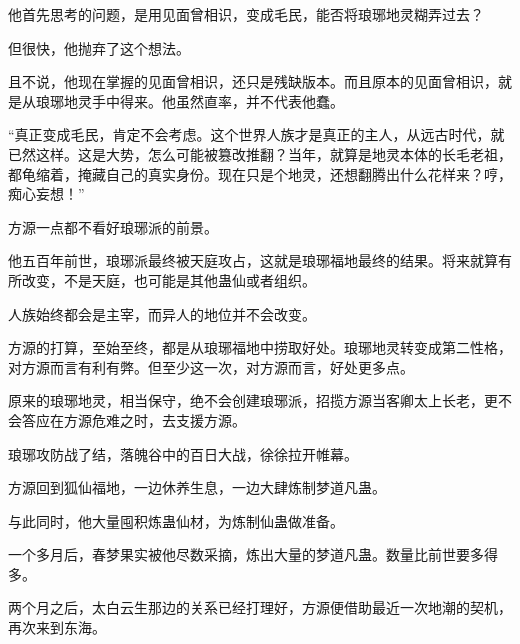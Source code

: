 \begin{this_body}
他首先思考的问题，是用见面曾相识，变成毛民，能否将琅琊地灵糊弄过去？

但很快，他抛弃了这个想法。

且不说，他现在掌握的见面曾相识，还只是残缺版本。而且原本的见面曾相识，就是从琅琊地灵手中得来。他虽然直率，并不代表他蠢。

“真正变成毛民，肯定不会考虑。这个世界人族才是真正的主人，从远古时代，就已然这样。这是大势，怎么可能被篡改推翻？当年，就算是地灵本体的长毛老祖，都龟缩着，掩藏自己的真实身份。现在只是个地灵，还想翻腾出什么花样来？哼，痴心妄想！”

方源一点都不看好琅琊派的前景。

他五百年前世，琅琊派最终被天庭攻占，这就是琅琊福地最终的结果。将来就算有所改变，不是天庭，也可能是其他蛊仙或者组织。

人族始终都会是主宰，而异人的地位并不会改变。

方源的打算，至始至终，都是从琅琊福地中捞取好处。琅琊地灵转变成第二性格，对方源而言有利有弊。但至少这一次，对方源而言，好处更多点。

原来的琅琊地灵，相当保守，绝不会创建琅琊派，招揽方源当客卿太上长老，更不会答应在方源危难之时，去支援方源。

琅琊攻防战了结，落魄谷中的百日大战，徐徐拉开帷幕。

方源回到狐仙福地，一边休养生息，一边大肆炼制梦道凡蛊。

与此同时，他大量囤积炼蛊仙材，为炼制仙蛊做准备。

一个多月后，春梦果实被他尽数采摘，炼出大量的梦道凡蛊。数量比前世要多得多。

两个月之后，太白云生那边的关系已经打理好，方源便借助最近一次地潮的契机，再次来到东海。

\end{this_body}

